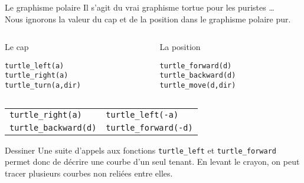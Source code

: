 \documentclass[10pt]{beamer}
\begin{document}
\begin{frame}[fragile]{Le graphisme polaire}
Il s'agit du vrai graphisme tortue pour les puristes \dots\\
Nous ignorons la valeur du cap et de la position dans le graphisme polaire pur.

\begin{columns}[t]
\begin{column}{0.48\textwidth}
  \begin{block}{Le cap}
    \begin{lstlisting}[style=edblock]
turtle_left(a)
turtle_right(a)
turtle_turn(a,dir)
    \end{lstlisting}
  \end{block}
\end{column}
\begin{column}{0.48\textwidth}
  \begin{block}{La position}
    \begin{lstlisting}[style=edblock]
turtle_forward(d)
turtle_backward(d)
turtle_move(d,dir)
    \end{lstlisting}
  \end{block}
\end{column}
\end{columns}

\begin{center}
\begin{tabular}{l@{ $\Leftrightarrow$ }l}
  \toprule
  \lstinline!turtle_right(a)! & \lstinline!turtle_left(-a)! \\
  \lstinline!turtle_backward(d)! & \lstinline!turtle_forward(-d)! \\
  \bottomrule
\end{tabular}
\end{center}

\begin{block}{Dessiner}
Une suite d'appels aux fonctions \texttt{turtle\_left} et \texttt{turtle\_forward} permet donc de décrire une courbe d'un seul tenant.
En levant le crayon, on peut tracer plusieurs courbes non reliées entre elles.
\end{block}
\end{frame}
\end{document}
